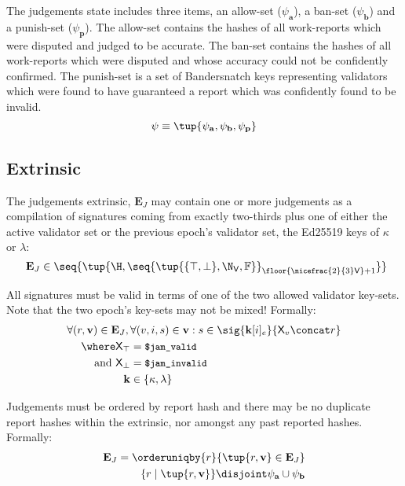 The judgements state includes three items, an allow-set ($\psi_\mathbf{a}$), a ban-set ($\psi_\mathbf{b}$) and a punish-set ($\psi_\mathbf{p}$). The allow-set contains the hashes of all work-reports which were disputed and judged to be accurate. The ban-set contains the hashes of all work-reports which were disputed and whose accuracy could not be confidently confirmed. The punish-set is a set of Bandersnatch keys representing validators which were found to have guaranteed a report which was confidently found to be invalid.
\begin{equation}
  \psi \equiv \tup{\psi_\mathbf{a}, \psi_\mathbf{b}, \psi_\mathbf{p}}
\end{equation}

\subsection{Extrinsic}

The judgements extrinsic, $\mathbf{E}_J$ may contain one or more judgements as a compilation of signatures coming from exactly two-thirds plus one of either the active validator set or the previous epoch's validator set, \ie the Ed25519 keys of $\kappa$ or $\lambda$:
\begin{equation}
  \mathbf{E}_J \in \seq{\tup{\H, \seq{\tup{\{\top, \bot\}, \N_{\mathsf{V}}, \mathbb{F}}}_{\floor{\nicefrac{2}{3}\mathsf{V}} + 1}}}\!\!\!
\end{equation}

All signatures must be valid in terms of one of the two allowed validator key-sets. Note that the two epoch's key-sets may not be mixed! Formally:
\begin{equation}
  \begin{aligned}
    \forall (r, \mathbf{v}) \in \mathbf{E}_J ,\, &\forall (v, i, s) \in \mathbf{v} : s \in \sig{\mathbf{k}[i]_e}{\mathsf{X}_v \concat r}\\
    \where \mathsf{X}_\top &= \text{{\small \texttt{\$jam\_valid}}} \\
    \text{and } \mathsf{X}_\bot &= \text{{\small \texttt{\$jam\_invalid}}} \\
    \mathbf{k} &\in \{ \kappa , \lambda \}
  \end{aligned}
\end{equation}

Judgements must be ordered by report hash and there may be no duplicate report hashes within the extrinsic, nor amongst any past reported hashes. Formally:
\begin{align}
  \mathbf{E}_J = \orderuniqby{r}{\tup{r, \mathbf{v}} \in \mathbf{E}_J} \\
  \{r \mid \tup{r, \mathbf{v}}\} \disjoint \psi_\mathbf{a} \cup \psi_\mathbf{b}
\end{align}

